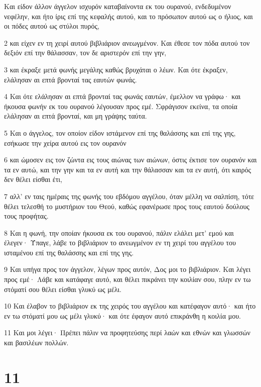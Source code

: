 \par Και είδον άλλον άγγελον ισχυρόν καταβαίνοντα εκ του ουρανού, ενδεδυμένον νεφέλην, και ήτο ίρις επί της κεφαλής αυτού, και το πρόσωπον αυτού ως ο ήλιος, και οι πόδες αυτού ως στύλοι πυρός,
\par 2 και είχεν εν τη χειρί αυτού βιβλιάριον ανεωγμένον. Και έθεσε τον πόδα αυτού τον δεξιόν επί την θάλασσαν, τον δε αριστερόν επί την γην,
\par 3 και έκραξε μετά φωνής μεγάλης καθώς βρυχάται ο λέων. Και ότε έκραξεν, ελάλησαν αι επτά βρονταί τας εαυτών φωνάς.
\par 4 Και ότε ελάλησαν αι επτά βρονταί τας φωνάς εαυτών, έμελλον να γράφω· και ήκουσα φωνήν εκ του ουρανού λέγουσαν προς εμέ. Σφράγισον εκείνα, τα οποία ελάλησαν αι επτά βρονταί, και μη γράψης ταύτα.
\par 5 Και ο άγγελος, τον οποίον είδον ιστάμενον επί της θαλάσσης και επί της γης, εσήκωσε την χείρα αυτού εις τον ουρανόν
\par 6 και ώμοσεν εις τον ζώντα εις τους αιώνας των αιώνων, όστις έκτισε τον ουρανόν και τα εν αυτώ, και την γην και τα εν αυτή και την θάλασσαν και τα εν αυτή, ότι καιρός δεν θέλει είσθαι έτι,
\par 7 αλλ' εν ταις ημέραις της φωνής του εβδόμου αγγέλου, όταν μέλλη να σαλπίση, τότε θέλει τελεσθή το μυστήριον του Θεού, καθώς εφανέρωσε προς τους εαυτού δούλους τους προφήτας.
\par 8 Και η φωνή, την οποίαν ήκουσα εκ του ουρανού, πάλιν ελάλει μετ' εμού και έλεγεν· Ύπαγε, λάβε το βιβλιάριον το ανεωγμένον εν τη χειρί του αγγέλου του ισταμένου επί της θαλάσσης και επί της γης.
\par 9 Και υπήγα προς τον άγγελον, λέγων προς αυτόν, Δος μοι το βιβλιάριον. Και λέγει προς εμέ· Λάβε και κατάφαγε αυτό, και θέλει πικράνει την κοιλίαν σου, πλην εν τω στόματί σου θέλει είσθαι γλυκύ ως μέλι.
\par 10 Και έλαβον το βιβλιάριον εκ της χειρός του αγγέλου και κατέφαγον αυτό· και ήτο εν τω στόματί μου ως μέλι γλυκύ· και ότε έφαγον αυτό επικράνθη η κοιλία μου.
\par 11 Και μοι λέγει· Πρέπει πάλιν να προφητεύσης περί λαών και εθνών και γλωσσών και βασιλέων πολλών.

\chapter{11}

